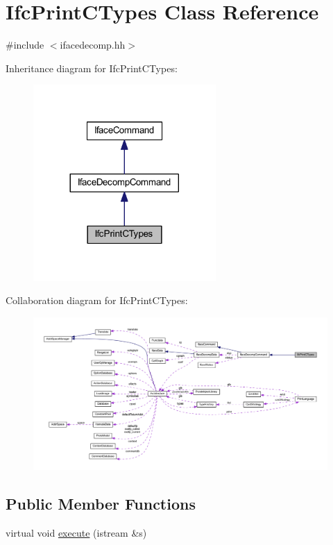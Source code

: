 \hypertarget{class_ifc_print_c_types}{}\section{Ifc\+Print\+C\+Types Class Reference}
\label{class_ifc_print_c_types}


{\ttfamily \#include $<$ifacedecomp.\+hh$>$}



Inheritance diagram for Ifc\+Print\+C\+Types\+:
\nopagebreak
\begin{figure}[H]
\begin{center}
\leavevmode
\includegraphics[width=197pt]{class_ifc_print_c_types__inherit__graph}
\end{center}
\end{figure}


Collaboration diagram for Ifc\+Print\+C\+Types\+:
\nopagebreak
\begin{figure}[H]
\begin{center}
\leavevmode
\includegraphics[width=350pt]{class_ifc_print_c_types__coll__graph}
\end{center}
\end{figure}
\subsection*{Public Member Functions}
\begin{DoxyCompactItemize}
\item 
virtual void \mbox{\hyperlink{class_ifc_print_c_types_a9f3c59436d04440a92041c217ddc7454}{execute}} (istream \&s)
\end{DoxyCompactItemize}
